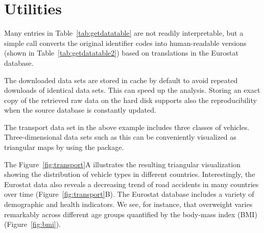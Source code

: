 \section{Utilities}

Many entries in Table~\ref{tab:getdatatable} are not readily
interpretable, but a simple call  converts
the original identifier codes into human-readable versions (shown in
Table~\ref{tab:getdatatable2}) based on translations in the Eurostat
database.

The downloaded data sets are stored in cache by default to avoid
repeated downloads of identical data sets. This can speed up the
analysis. Storing an exact copy of the retrieved raw data on the hard
disk supports also the reproducibility when the source database is
constantly updated.

The transport data set in the above example includes three classes of
vehicles. Three-dimensional data sets such as this can be conveniently
visualized as triangular maps by using
the  \citep{plotrix} package.


The Figure~\ref{fig:transport}A illustrates the resulting triangular
visualization showing the distribution of vehicle types in different
countries. Interestingly, the Eurostat data also reveals a decreasing
trend of road accidents in many countries over time
(Figure~\ref{fig:transport}B). The Eurostat database includes a
variety of demographic and health indicators. We see, for instance,
that overweight varies remarkably across different age groups
quantified by the body-mass index (BMI) (Figure~\ref{fig:bmi}).


